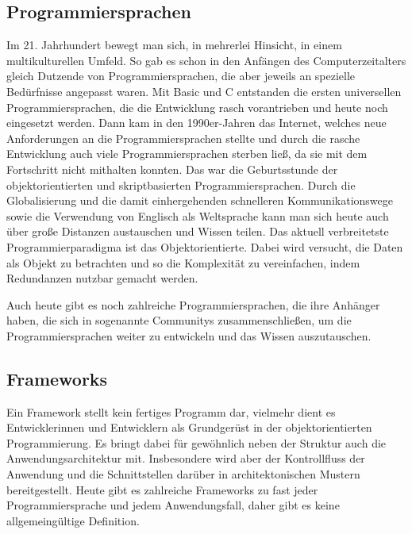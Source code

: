 \newpage
\fancyhead[L]{\nouppercase{\leftmark}} %
\subsection{Programmiersprachen}
Im 21. Jahrhundert bewegt man sich, in mehrerlei Hinsicht, in einem multikulturellen 
Umfeld. So gab es schon in den Anfängen des Computerzeitalters gleich Dutzende 
von Programmiersprachen, die aber jeweils an spezielle Bedürfnisse angepasst 
waren. Mit Basic und C entstanden die ersten universellen
Programmiersprachen, die die Entwicklung rasch vorantrieben und heute 
noch eingesetzt werden. Dann kam in den 1990er-Jahren das Internet, welches 
neue Anforderungen an die Programmiersprachen stellte und durch die rasche 
Entwicklung auch viele Programmiersprachen sterben ließ, da sie mit dem 
Fortschritt nicht mithalten konnten. Das war die Geburtsstunde der 
objektorientierten und skriptbasierten Programmiersprachen. Durch die 
Globalisierung und die damit einhergehenden schnelleren Kommunikationswege 
sowie die Verwendung von Englisch als Weltsprache kann man sich heute auch über große 
Distanzen austauschen und Wissen teilen. Das aktuell verbreitetste Programmierparadigma 
ist das Objektorientierte. Dabei wird versucht, die Daten als Objekt zu betrachten und so die 
Komplexität zu vereinfachen, indem Redundanzen nutzbar gemacht werden.

Auch heute gibt es noch zahlreiche Programmiersprachen, die ihre Anhänger
haben, die sich in sogenannte Communitys zusammenschließen, um die 
Programmiersprachen weiter zu entwickeln und das Wissen auszutauschen.

\subsection{Frameworks} 
Ein Framework stellt kein fertiges Programm dar, vielmehr dient es 
Entwicklerinnen und Entwicklern als Grundgerüst in der 
objektorientierten Programmierung. Es bringt dabei für gewöhnlich neben 
der Struktur auch die Anwendungsarchitektur mit. Insbesondere wird 
aber der Kontrollfluss der Anwendung und die Schnittstellen darüber
in architektonischen Mustern bereitgestellt. 
Heute gibt es zahlreiche Frameworks zu fast jeder Programmiersprache und
jedem Anwendungsfall, daher gibt es keine allgemeingültige Definition.   

